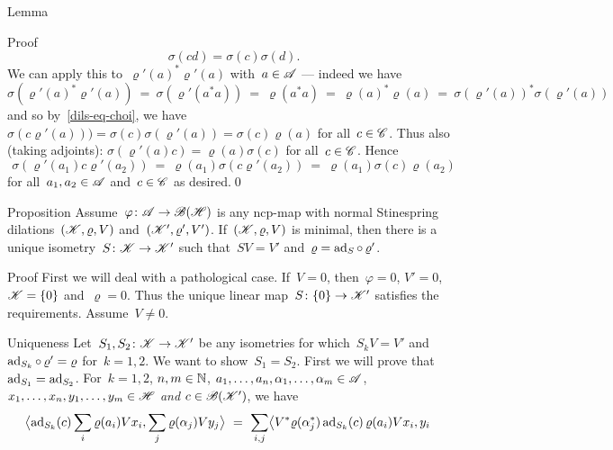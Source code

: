 \documentclass[b]{subfiles}
\begin{document}
\begin{parsec}
\begin{point}{Lemma}
\begin{point}{Proof}
\begin{equation}
    \sigma(cd) = \sigma(c)\sigma(d).\label{dils-eq-choi}
\end{equation}
We can apply this to~$\varrho'(a)^*\varrho'(a)$
with~$a \in \mathscr{A}$ --- indeed we have
\begin{equation*}
\sigma(\varrho'(a)^* \varrho'(a))
  \   =\ \sigma(\varrho'(a^*a))
  \  =\ \varrho(a^*a)
  \  =\ \varrho(a)^*\varrho(a)
  \  =\ \sigma(\varrho'(a))^*\sigma(\varrho'(a))
\end{equation*}
and so by~\eqref{dils-eq-choi},
    we have~$\sigma(c\varrho'(a)))
        = \sigma(c)\sigma(\varrho'(a)) = \sigma(c)\varrho(a)$
        for all~$c \in \mathscr{C}$.
Thus also (taking adjoints):
$\sigma(\varrho'(a)c) = \varrho(a)\sigma(c)$ for all~$c \in \mathscr{C}$.
Hence
\begin{equation*}
\sigma(\varrho'(a_1)c\varrho'(a_2))
            \ =\  \varrho(a_1)\sigma(c \varrho'(a_2))
            \ =\  \varrho(a_1) \sigma(c) \varrho(a_2)
\end{equation*}
    for all~$a_1,a_2 \in \mathscr{A}$ and~$c\in \mathscr{C}$ as desired.\qed
\end{point}
\end{point}
\begin{point}{Proposition}%
    Assume~$\varphi\colon \mathscr{A} \to \mathscr{B}(\mathscr{H})$
        is any ncp-map with normal
        Stinespring dilations~$(\mathscr{K}, \varrho, V)$
    and~$(\mathscr{K}', \varrho', V')$.
        If~$(\mathscr{K},\varrho,V)$ is minimal,
        then there is a unique isometry~$S\colon \mathscr{K} \to \mathscr{K}'$
        such that~$SV=V'$ and~$\varrho = \mathrm{ad}_S\mathop{\circ} \varrho'$.
\begin{point}{Proof}
First we will deal with a pathological case.
If~$V = 0$, then~$\varphi = 0$, $V' = 0$, $\mathscr{K} = \{0\}$
and~$\varrho = 0$.  Thus the unique linear map~$S\colon \{0\} \to \mathscr{K}'$
satisfies the requirements.  Assume~$V \neq 0$.
\begin{point}{Uniqueness}%
Let~$S_1,S_2\colon \mathscr{K} \to \mathscr{K}'$
be any isometries for which~$S_k V = V'$ and~$\mathrm{ad}_{S_k} \mathop{\circ} \varrho' = \varrho$
for~$k =1,2$.
We want to show~$S_1=S_2$.
First we will prove that~$\mathrm{ad}_{S_1} = \mathrm{ad}_{S_2}$.
For~$k=1,2$, $n, m\in \mathbb{N}$, $a_1, \ldots, a_n,\alpha_1, \ldots, \alpha_m \in \mathscr{A}$,
$x_1, \ldots, x_n, y_1, \ldots, y_m \in \mathscr{H}$ \emph{and}
    $c \in \mathscr{B}(\mathscr{K}')$,
    we have
\begin{align*}
    \bigl< \ad_{S_k}(c)
        \sum_i \varrho(a_i) V x_i,
        \sum_j \varrho(\alpha_j) V y_j \bigr>
    &\ = \ \sum_{i,j}
        \bigl< V^* \varrho(\alpha_j^*) \,\ad_{S_k}(c)\, \varrho(a_i) V x_i, y_i

\end{align*}
\end{point}
\end{point}
\end{point}
\end{parsec}
\end{document}
